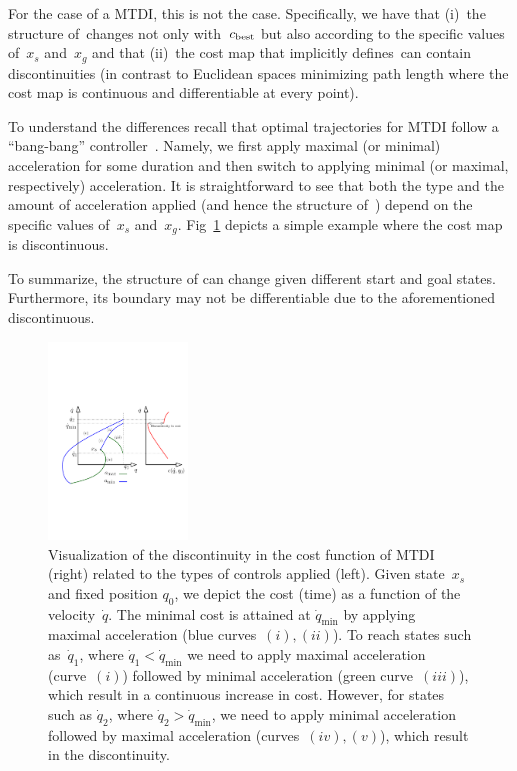 \documentclass[letterpaper, 10 pt, conference]{ieeeconf}  %
\begin{document}
For the case of a MTDI, this is not the case. 
Specifically, we have that 
(i)~the structure of~\Cinf changes not only with~$c_{\rm best}$ but also according to the specific values of~$x_s$ and~$x_g$ 
and that
(ii)~the cost map that implicitly defines~\Cinf can contain discontinuities (in contrast to Euclidean spaces minimizing path length where the cost map is continuous and differentiable at every point).

To understand the differences recall that optimal trajectories  for MTDI follow a ``bang-bang'' controller~\cite{HN10, KS14}.
Namely, we first apply maximal (or minimal) acceleration for some duration and then switch to applying minimal (or maximal, respectively) acceleration.
It is straightforward to see that both the type and the amount of acceleration applied (and hence the structure of~\Cinf) depend on the specific values of~$x_s$ and~$x_g$. 
Fig~\ref{fig:discont} depicts a simple example where the cost map is discontinuous.

To summarize, the structure of \Cinf can change given different start and goal states.
Furthermore,  its boundary may not be  differentiable due to the aforementioned discontinuous.

\begin{figure}[tb]
  \centering
  	\includegraphics[height = 5.25cm ]{fig/cost_discontinuity.pdf}
  \caption{
    \captionstyle
  	Visualization of the discontinuity in the cost function of MTDI (right) related to the types of controls applied (left). 
  	Given state~$x_s$ and fixed position $q_0$, we depict the cost (time) as a function of the velocity~$\dot{q}$. 
  	The minimal cost is attained at $\dot{q}_{\min}$ by applying maximal acceleration (blue curves~$(i), (ii)$). 
  	To reach states such as~$\dot{q}_1$, where $\dot{q}_1 < \dot{q}_{\min}$ we need to apply maximal acceleration (curve~$(i)$) followed by minimal acceleration (green curve~$(iii)$), which result in a continuous increase in cost.
  	However, for states such as $\dot{q}_2$, where $\dot{q}_2 > \dot{q}_{\min}$, we need to apply minimal acceleration  followed by maximal acceleration (curves~$(iv), (v)$), which result in the discontinuity.
  	}
   	\label{fig:discont}
\end{figure}
\end{document}
